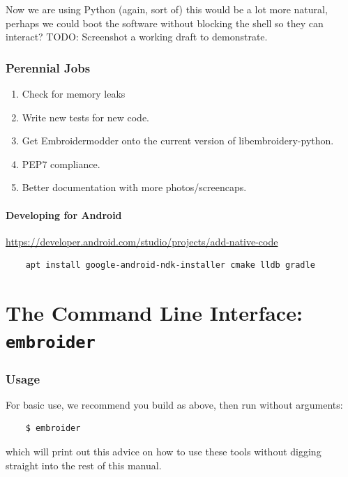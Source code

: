 \documentclass[a4paper, 11pt]{report}
\begin{document}
Now we are using Python (again, sort of) this would be a lot more natural,
perhaps we could boot the software without blocking the shell so they can
interact? TODO: Screenshot a working draft to demonstrate.

\subsection{Perennial Jobs}

\begin{enumerate}
\item Check for memory leaks
\item Write new tests for new code.
\item Get Embroidermodder onto the current version of libembroidery-python.
\item PEP7 compliance.
\item Better documentation with more photos/screencaps.
\end{enumerate}

\subsubsection{Developing for Android}

\url{https://developer.android.com/studio/projects/add-native-code}

\begin{verbatim}
    apt install google-android-ndk-installer cmake lldb gradle
\end{verbatim}

\chapter{The Command Line Interface: \texttt{embroider}}

\subsection{Usage}

For basic use, we recommend you build as above, then run without arguments:

\begin{verbatim}
    $ embroider
\end{verbatim}

which will print out this advice on how to use these tools without digging straight into the rest of this manual.


\end{document}
